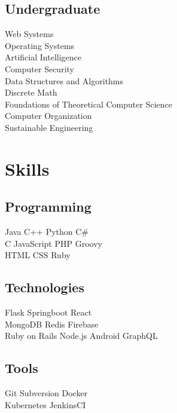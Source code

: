 \documentclass[letterpaper]{deedy-resume} %
\begin{document}
\begin{minipage}[t]{0.33\textwidth}
\subsection{Undergraduate}

Web Systems \\
Operating Systems \\
Artificial Intelligence \\
Computer Security \\
Data Structures and Algorithms \\
Discrete Math \\
Foundations of Theoretical Computer Science \\
Computer Organization \\
Sustainable Engineering \\


\sectionspace %


\section{Skills}

\subsection{Programming}

Java \textbullet{} C++ \textbullet{} Python \textbullet{} C\# \\
C \textbullet{} JavaScript \textbullet{} PHP \textbullet{} Groovy \\
\textbullet{} HTML \textbullet{} CSS \textbullet{} Ruby \\

\subsection{Technologies}
Flask \textbullet{} Springboot \textbullet{} React \\
\textbullet{} MongoDB \textbullet{} Redis \textbullet{} Firebase \\
\textbullet{} Ruby on Rails \textbullet{} Node.js \textbullet{} Android
\textbullet{} GraphQL
\subsection{Tools}
Git \textbullet{} Subversion \textbullet{} Docker \\
\textbullet{} Kubernetes \textbullet{} JenkinsCI  \\

\sectionspace %


\end{minipage} %
\end{document}
